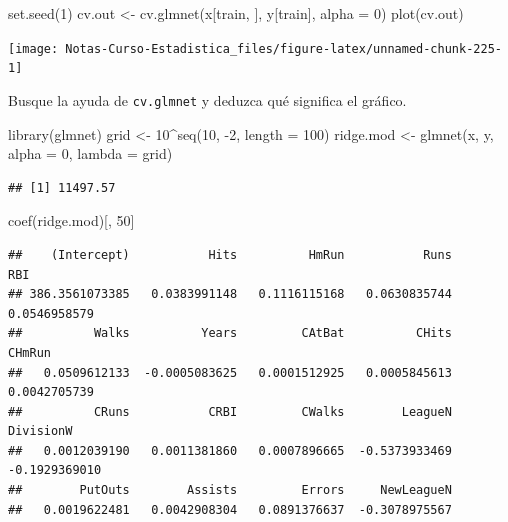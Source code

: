 \documentclass[
  12pt,
]{book}
\newenvironment{Shaded}{\begin{snugshade}}{\end{snugshade}}
\newcommand{\AttributeTok}[1]{\textcolor[rgb]{0.77,0.63,0.00}{#1}}
\newcommand{\DecValTok}[1]{\textcolor[rgb]{0.00,0.00,0.81}{#1}}
\newcommand{\FunctionTok}[1]{\textcolor[rgb]{0.00,0.00,0.00}{#1}}
\newcommand{\NormalTok}[1]{#1}
\newcommand{\OtherTok}[1]{\textcolor[rgb]{0.56,0.35,0.01}{#1}}
\newcommand{\SpecialCharTok}[1]{\textcolor[rgb]{0.00,0.00,0.00}{#1}}
\begin{document}
\begin{Shaded}
\begin{Highlighting}[]
\FunctionTok{set.seed}\NormalTok{(}\DecValTok{1}\NormalTok{)}
\NormalTok{cv.out }\OtherTok{\textless{}{-}} \FunctionTok{cv.glmnet}\NormalTok{(x[train, ], y[train], }\AttributeTok{alpha =} \DecValTok{0}\NormalTok{)}
\FunctionTok{plot}\NormalTok{(cv.out)}
\end{Highlighting}
\end{Shaded}

\begin{center}\texttt{[image: Notas-Curso-Estadistica\_files/figure-latex/unnamed-chunk-225-1]} \end{center}

Busque la ayuda de \texttt{cv.glmnet} y deduzca qué significa el
gráfico.

\begin{Shaded}
\begin{Highlighting}[]
\FunctionTok{library}\NormalTok{(glmnet)}
\NormalTok{grid }\OtherTok{\textless{}{-}} \DecValTok{10}\SpecialCharTok{\^{}}\FunctionTok{seq}\NormalTok{(}\DecValTok{10}\NormalTok{, }\SpecialCharTok{{-}}\DecValTok{2}\NormalTok{, }\AttributeTok{length =} \DecValTok{100}\NormalTok{)}
\NormalTok{ridge.mod }\OtherTok{\textless{}{-}} \FunctionTok{glmnet}\NormalTok{(x, y, }\AttributeTok{alpha =} \DecValTok{0}\NormalTok{, }\AttributeTok{lambda =}\NormalTok{ grid)}
\end{Highlighting}
\end{Shaded}

\begin{Shaded}
\end{Shaded}

\begin{verbatim}
## [1] 11497.57
\end{verbatim}

\begin{Shaded}
\begin{Highlighting}[]
\FunctionTok{coef}\NormalTok{(ridge.mod)[, }\DecValTok{50}\NormalTok{]}
\end{Highlighting}
\end{Shaded}

\begin{verbatim}
##    (Intercept)           Hits          HmRun           Runs            RBI 
## 386.3561073385   0.0383991148   0.1116115168   0.0630835744   0.0546958579 
##          Walks          Years         CAtBat          CHits         CHmRun 
##   0.0509612133  -0.0005083625   0.0001512925   0.0005845613   0.0042705739 
##          CRuns           CRBI         CWalks        LeagueN      DivisionW 
##   0.0012039190   0.0011381860   0.0007896665  -0.5373933469  -0.1929369010 
##        PutOuts        Assists         Errors     NewLeagueN 
##   0.0019622481   0.0042908304   0.0891376637  -0.3078975567
\end{verbatim}
\end{document}
